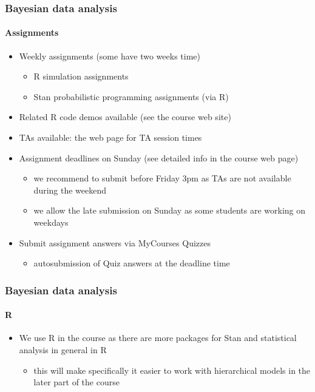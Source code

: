 \documentclass[english,t]{beamer}
\begin{document}
\begin{frame}
  \frametitle{Bayesian data analysis}  %
  \framesubtitle{Assignments}
  \begin{itemize}
  \item Weekly assignments (some have two weeks time)
    \begin{itemize}
    \item R simulation assignments
    \item Stan probabilistic programming assignments (via R)
    \end{itemize}
  \item Related R code demos available (see the course web site)
  \item TAs available: the web page for TA session times
  \item Assignment deadlines on Sunday (see detailed info in the course web page)
    \begin{itemize}
    \item we recommend to submit before Friday 3pm as TAs are not
      available during the weekend
    \item we allow the late submission on Sunday as some students are
      working on weekdays
    \end{itemize}
  \item Submit assignment answers via MyCourses Quizzes
    \begin{itemize}
    \item autosubmission of Quiz answers at the deadline time
    \end{itemize}
  \end{itemize}
  
\end{frame}

\begin{frame}
  \frametitle{Bayesian data analysis}  %
  \framesubtitle{R}

  \begin{itemize}
  \item We use R in the course as there are more packages for Stan and
    statistical analysis in general in R
    \begin{itemize}
    \item this will make specifically it easier to work with
      hierarchical models in the later part of the course
    \end{itemize}
  \end{itemize}
  
\end{frame}
\end{document}
